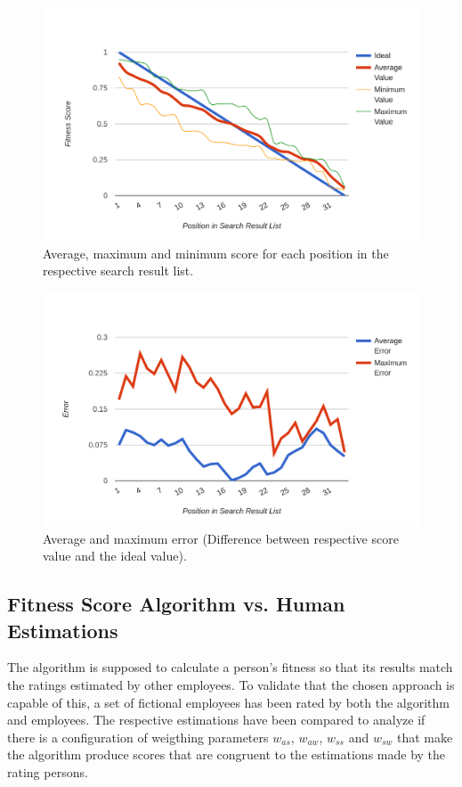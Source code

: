 \begin{figure}[H]
    \centering
    \includegraphics[width=\textwidth]{images/dist_avg.png}
    \caption[Diagram: Fitness Score Distribution (Processed)]{Average, maximum and minimum score for each position in the respective search result list.}
    \label{fig:dist-avg}
\end{figure}

\begin{figure}[H]
    \centering
    \includegraphics[width=\textwidth]{images/dist_error.png}
    \caption[Diagram: Fitness Score Distribution (Error Rates)]{Average and maximum error (Difference between respective score value and the ideal value).}
    \label{fig:dist-err}
\end{figure}

\newpage

\subsection{Fitness Score Algorithm vs. Human Estimations}
The algorithm is supposed to calculate a person's fitness so that its results match the ratings estimated by other employees. To validate that
the chosen approach is capable of this, a set of fictional employees has been rated by both the algorithm and employees. The respective estimations have been compared to analyze if there is a configuration of weigthing parameters $w_{as}$, $w_{aw}$, $w_{ss}$ and $w_{sw}$ that make the algorithm produce scores that are
congruent to the estimations made by the rating persons.

